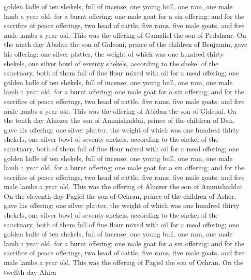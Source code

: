 golden ladle of ten shekels, full of incense;  one young
bull, one ram, one male lamb a year old, for a burnt offering;
 one male goat for a sin offering;  and
for the sacrifice of peace offerings, two head of cattle, five rams,
five male goats, and five male lambs a year old. This was the offering
of Gamaliel the son of Pedahzur.  On the ninth day Abidan
the son of Gideoni, prince of the children of Benjamin, 
gave his offering: one silver platter, the weight of which was one
hundred thirty shekels, one silver bowl of seventy shekels, according to
the shekel of the sanctuary, both of them full of fine flour mixed with
oil for a meal offering;  one golden ladle of ten
shekels, full of incense;  one young bull, one ram, one
male lamb a year old, for a burnt offering;  one male
goat for a sin offering;  and for the sacrifice of peace
offerings, two head of cattle, five rams, five male goats, and five male
lambs a year old. This was the offering of Abidan the son of Gideoni.
 On the tenth day Ahiezer the son of Ammishaddai, prince
of the children of Dan,  gave his offering: one silver
platter, the weight of which was one hundred thirty shekels, one silver
bowl of seventy shekels, according to the shekel of the sanctuary, both
of them full of fine flour mixed with oil for a meal offering;
 one golden ladle of ten shekels, full of incense;
 one young bull, one ram, one male lamb a year old, for a
burnt offering;  one male goat for a sin offering;
 and for the sacrifice of peace offerings, two head of
cattle, five rams, five male goats, and five male lambs a year old. This
was the offering of Ahiezer the son of Ammishaddai.  On
the eleventh day Pagiel the son of Ochran, prince of the children of
Asher,  gave his offering: one silver platter, the weight
of which was one hundred thirty shekels, one silver bowl of seventy
shekels, according to the shekel of the sanctuary, both of them full of
fine flour mixed with oil for a meal offering;  one
golden ladle of ten shekels, full of incense;  one young
bull, one ram, one male lamb a year old, for a burnt offering;
 one male goat for a sin offering;  and
for the sacrifice of peace offerings, two head of cattle, five rams,
five male goats, and five male lambs a year old. This was the offering
of Pagiel the son of Ochran.  On the twelfth day Ahira
